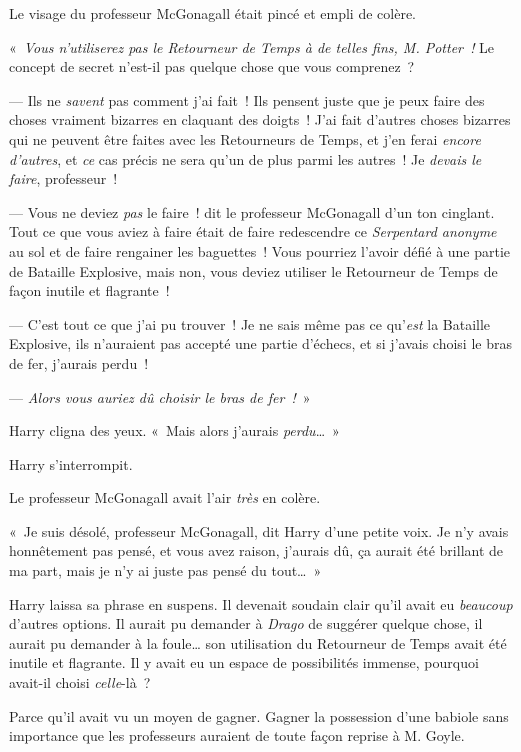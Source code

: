 Le visage du professeur McGonagall était pincé et empli de colère.

«~\emph{Vous n'utiliserez pas le Retourneur de Temps à de telles fins, M. Potter~!} Le concept de secret n'est-il pas quelque chose que vous comprenez~?

--- Ils ne \emph{savent} pas comment j'ai fait~! Ils pensent juste que je peux faire des choses vraiment bizarres en claquant des doigts~! J'ai fait d'autres choses bizarres qui ne peuvent être faites avec les Retourneurs de Temps, et j'en ferai \emph{encore d'autres}, et \emph{ce} cas précis ne sera qu'un de plus parmi les autres~! Je \emph{devais le faire}, professeur~!

--- Vous ne deviez \emph{pas} le faire~! dit le professeur McGonagall d'un ton cinglant. Tout ce que vous aviez à faire était de faire redescendre ce \emph{Serpentard anonyme} au sol et de faire rengainer les baguettes~! Vous pourriez l'avoir défié à une partie de Bataille Explosive, mais non, vous deviez utiliser le Retourneur de Temps de façon inutile et flagrante~!

--- C'est tout ce que j'ai pu trouver~! Je ne sais même pas ce qu'\emph{est} la Bataille Explosive, ils n'auraient pas accepté une partie d'échecs, et si j'avais choisi le bras de fer, j'aurais perdu~!

--- \emph{Alors vous auriez dû choisir le bras de fer~!}~»

Harry cligna des yeux. «~Mais alors j'aurais \emph{perdu}…~»

Harry s'interrompit.

Le professeur McGonagall avait l'air \emph{très} en colère.

«~Je suis désolé, professeur McGonagall, dit Harry d'une petite voix. Je n'y avais honnêtement pas pensé, et vous avez raison, j'aurais dû, ça aurait été brillant de ma part, mais je n'y ai juste pas pensé du tout…~»

Harry laissa sa phrase en suspens. Il devenait soudain clair qu'il avait eu \emph{beaucoup} d'autres options. Il aurait pu demander à \emph{Drago} de suggérer quelque chose, il aurait pu demander à la foule… son utilisation du Retourneur de Temps avait été inutile et flagrante. Il y avait eu un espace de possibilités immense, pourquoi avait-il choisi \emph{celle}-là~?

Parce qu'il avait vu un moyen de gagner. Gagner la possession d'une babiole sans importance que les professeurs auraient de toute façon reprise à M. Goyle.

